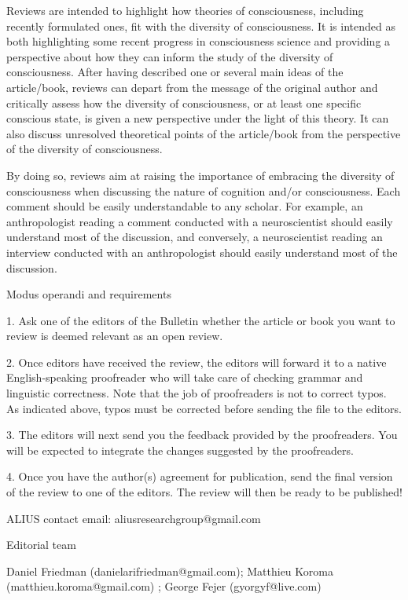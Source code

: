 \documentclass[11pt]{article}
\begin{document}
Reviews are intended to highlight how theories of consciousness, including recently formulated ones, fit with the diversity of consciousness. It is intended as both highlighting some recent progress in consciousness science and providing a perspective about how they can inform the study of the diversity of consciousness. After having described one or several main ideas of the article/book, reviews can depart from the message of the original author and critically assess how the diversity of consciousness, or at least one specific conscious state, is given a new perspective under the light of this theory. It can also discuss unresolved theoretical points of the article/book from the perspective of the diversity of consciousness.\par

By doing so, reviews aim at raising the importance of embracing the diversity of consciousness when discussing the nature of cognition and/or consciousness. Each comment should be easily understandable to any scholar. For example, an anthropologist reading a comment conducted with a neuroscientist should easily understand most of the discussion, and conversely, a neuroscientist reading an interview conducted with an anthropologist should easily understand most of the discussion.\par

Modus operandi and requirements\par

1. Ask one of the editors of the Bulletin whether the article or book you want to review is deemed relevant as an open review.\par

2. Once editors have received the review, the editors will forward it to a native English-speaking proofreader who will take care of checking grammar and linguistic correctness. Note that the job of proofreaders is not to correct typos. As indicated above, typos must be corrected before sending the file to the editors.\par

3. The editors will next send you the feedback provided by the proofreaders. You will be expected to integrate the changes suggested by the proofreaders.\par

4. Once you have the author(s) agreement for publication, send the final version of the review to one of the editors. The review will then be ready to be published!\par

ALIUS contact email: aliusresearchgroup@gmail.com\par

Editorial team\par

Daniel Friedman (danielarifriedman@gmail.com); Matthieu Koroma (matthieu.koroma@gmail.com) ; George Fejer (gyorgyf@live.com)\par
\end{document}
